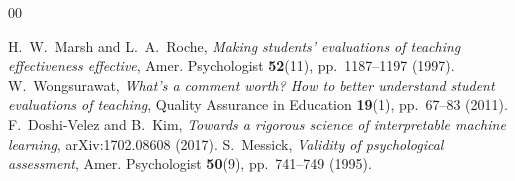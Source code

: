 \documentclass[11pt]{article}
\begin{document}
\vspace{-0.2cm}
\begin{thebibliography}{00}
\setlength{\itemsep}{-1mm}
\footnotesize
{} H.~W.~Marsh and L.~A.~Roche, \textit{Making students' evaluations of teaching effectiveness effective}, Amer. Psychologist \textbf{52}(11), pp.~1187--1197 (1997).
 W.~Wongsurawat, \textit{What's a comment worth? How to better understand student evaluations of teaching}, Quality Assurance in Education \textbf{19}(1), pp.~67--83 (2011).
 F.~Doshi-Velez and B.~Kim, \textit{Towards a rigorous science of interpretable machine learning}, arXiv:1702.08608 (2017).
 S.~Messick, \textit{Validity of psychological assessment}, Amer. Psychologist \textbf{50}(9), pp.~741--749 (1995).
\end{thebibliography}
\normalsize
\end{document}
